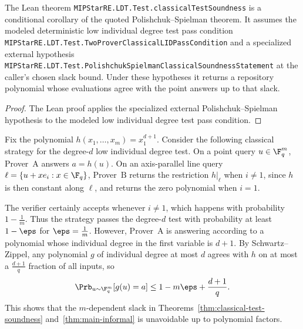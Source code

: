 \begin{proposition}\label{prop:lean-classical-test-soundness-interface}
	\leanok
	The Lean theorem \texttt{MIPStarRE.LDT.Test.classicalTestSoundness} is a
	conditional corollary of the quoted Polishchuk--Spielman theorem.  It assumes
	the modeled deterministic low individual degree test pass condition
	\texttt{MIPStarRE.LDT.Test.TwoProverClassicalLIDPassCondition} and a
	specialized external hypothesis
	\texttt{MIPStarRE.LDT.Test.PolishchukSpielmanClassicalSoundnessStatement}
	at the caller's chosen slack bound.  Under these hypotheses it returns a
	repository polynomial whose evaluations agree with the point answers up to
	that slack.
\end{proposition}
\begin{proof}
	\leanok
	The Lean proof applies the specialized external Polishchuk--Spielman
	hypothesis to the modeled low individual degree test pass condition.
\end{proof}

\begin{remark}\label{ex:bad-individual-degree-example}
		Fix the polynomial $h(x_1, \ldots, x_m) = x_1^{d+1}$. Consider the following classical strategy for the degree-$d$ low individual degree test. On a point query $u \in \F_q^m$, Prover~$\mathrm{A}$ answers $a = h(u)$. On an axis-parallel line query $\ell = \{u + x e_i : x \in \F_q\}$, Prover~$\mathrm{B}$ returns the restriction $h\vert_{\ell}$ when $i \neq 1$, since $h$ is then constant along $\ell$, and returns the zero polynomial when $i = 1$.

		The verifier certainly accepts whenever $i \neq 1$, which happens with probability $1 - \frac{1}{m}$. Thus the strategy passes the degree-$d$ test with probability at least $1-\eps$ for $\eps = \frac{1}{m}$. However, Prover~$\mathrm{A}$ is answering according to a polynomial whose individual degree in the first variable is $d+1$. By Schwartz--Zippel, any polynomial $g$ of individual degree at most $d$ agrees with $h$ on at most a $\frac{d+1}{q}$ fraction of all inputs, so
		\[
			\Prb_{u \sim \F_q^m}[g(u)=a] \le 1 - m\eps + \frac{d+1}{q}.
		\]
		This shows that the $m$-dependent slack in Theorems~\ref{thm:classical-test-soundness} and~\ref{thm:main-informal} is unavoidable up to polynomial factors.
\end{remark}

